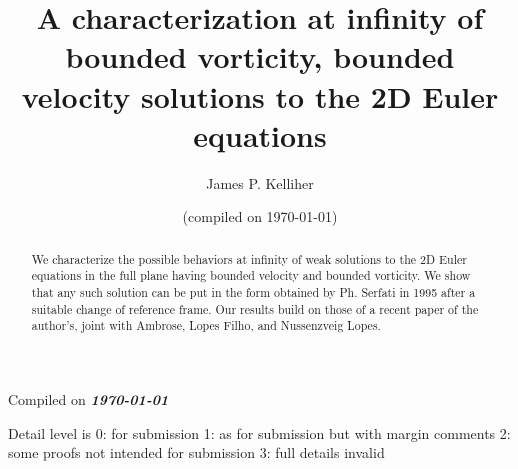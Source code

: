 \documentclass[reqno,openright,11pt,twoside]{amsart}
\newcounter{dtlForSubmission} \setcounter{dtlForSubmission}{0}
\newcounter{dtlMarginComments} \setcounter{dtlMarginComments}{1}
\newcounter{dtlSomeDetail} \setcounter{dtlSomeDetail}{2}
\newcounter{dtlFullDetails} \setcounter{dtlFullDetails}{3}
\newcounter{DetailLevel} \setcounter{DetailLevel}{\value{dtlForSubmission}}
\theoremstyle{definition}
\numberwithin{equation}{section}
\begin{document}
\raggedbottom

 

\author[Kelliher]{James P. Kelliher}
\address{Department of Mathematics, University of California, Riverside, 900 University Ave.,
Riverside, CA 92521}
 



\title
    [Bounded vorticity, bounded velocity 2D Euler]
    {A characterization at infinity of bounded vorticity, bounded velocity solutions to the 2D Euler equations}
     
\begin{abstract}
We characterize the possible behaviors at infinity of weak solutions to the 2D Euler equations in the full plane having bounded velocity and bounded vorticity. We show that any such solution can be put in the form obtained by Ph. Serfati in 1995 after a suitable change of reference frame. Our results build on those of a recent paper of the author's, joint with Ambrose, Lopes Filho, and Nussenzveig Lopes.
\end{abstract}

\date{(compiled on \today)}

\maketitle

\vspace{-0.3in}

{} 

{
    \ifthenelse{\value{DetailLevel}=\value{dtlMarginComments} \or \value{DetailLevel}>\value{dtlMarginComments}}
        {{\small {
    \begin{small}
        \begin{flushright}
            Compiled on \textit{\textbf{\today}}

            {
    Detail level is
    \ifthenelse{\value{DetailLevel}=\value{dtlForSubmission}}
        {0: for submission}
        {\ifthenelse{\value{DetailLevel}=\value{dtlMarginComments}}
            {1: as for submission but with margin comments}
            {\ifthenelse{\value{DetailLevel}=\value{dtlSomeDetail}}
                {2: some proofs not intended for submission}
               {\ifthenelse{\value{DetailLevel}=\value{dtlFullDetails}}
                   {3: full details}
                   {invalid}
                }
            }
        }
    }

        \end{flushright}
    \end{small}
    }}}{}
    }
    
\end{document}
